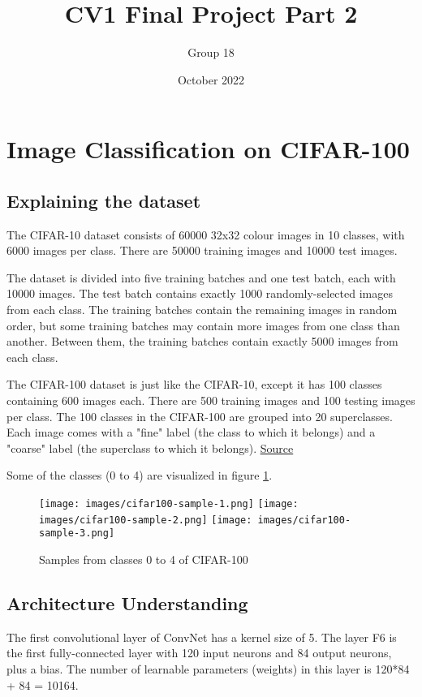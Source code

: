 \documentclass{article}
\title{CV1 Final Project Part 2}
\author{Group 18}
\date{October 2022}
\begin{document}
\maketitle

\section{Image Classification on CIFAR-100}
\subsection{Explaining the dataset}
The CIFAR-10 dataset consists of 60000 32x32 colour images in 10 classes, with 6000 images per class. There are 50000 training images and 10000 test images.

The dataset is divided into five training batches and one test batch, each with 10000 images. The test batch contains exactly 1000 randomly-selected images from each class. The training batches contain the remaining images in random order, but some training batches may contain more images from one class than another. Between them, the training batches contain exactly 5000 images from each class.

The CIFAR-100 dataset is just like the CIFAR-10, except it has 100 classes containing 600 images each. There are 500 training images and 100 testing images per class. The 100 classes in the CIFAR-100 are grouped into 20 superclasses. Each image comes with a "fine" label (the class to which it belongs) and a "coarse" label (the superclass to which it belongs). \href{https://www.cs.toronto.edu/~kriz/cifar.html}{Source}

Some of the classes (0 to 4) are visualized in figure \ref{fig:cifar100-sample}.

\begin{figure}[h]
    \centering
    \texttt{[image: images/cifar100-sample-1.png]}
    \texttt{[image: images/cifar100-sample-2.png]}
    \texttt{[image: images/cifar100-sample-3.png]}
    \caption{Samples from classes 0 to 4 of CIFAR-100}
    \label{fig:cifar100-sample}
\end{figure}


\subsection{Architecture Understanding}
The first convolutional layer of ConvNet has a kernel size of 5.
The layer F6 is the first fully-connected layer with 120 input neurons and 84 output neurons, plus a bias. The number of learnable parameters (weights) in this layer is 120*84 + 84 = 10164.
\end{document}
